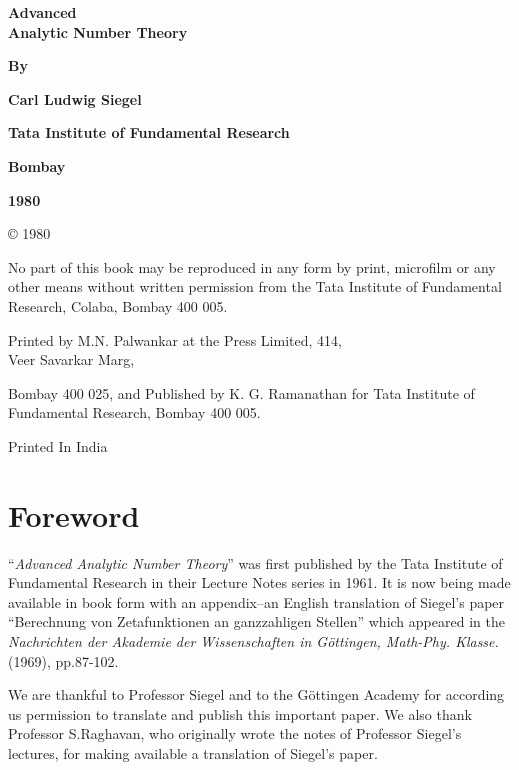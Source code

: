 \thispagestyle{empty}

\begin{center}
{\Large\bf Advanced}\\[5pt]
{\Large\bf Analytic Number Theory}
\vskip 1cm

{\bf By}
\medskip

{\large\bf Carl Ludwig Siegel}
\vfill

{\bf Tata Institute of Fundamental Research}

{\bf Bombay}

{\bf 1980}

\end{center}
\eject

\thispagestyle{empty}
\vfill

\begin{center}
\copyright {} 1980


\vfill

\parbox{0.7\textwidth}{No part of this book may be reproduced
in any form by print, microfilm or any
other means without written permission
from the Tata Institute of Fundamental
Research, Colaba, Bombay 400 005.}
\vfill

Printed by M.N. Palwankar at the Press Limited, 414,\\ Veer Savarkar
Marg,

Bombay 400 025, and Published by K. G. Ramanathan for Tata Institute
of Fundamental Research, Bombay 400 005.
\vfill 

Printed In India
\end{center}

\eject

\chapter{Foreword}


``{\em Advanced Analytic Number Theory}'' was first published by the
Tata Institute of Fundamental Research in their Lecture Notes series
in 1961. It is now being made available in book form with an
appendix--an English translation of Siegel's paper ``Berechnung von
Zetafunktionen an ganzzahligen Stellen'' which appeared in the {\em
  Nachrichten der Akademie der Wissenschaften in G\"ottingen,
  Math-Phy. Klasse.} (1969), pp.\@ 87-102.  

\medskip


We are thankful to Professor Siegel and to the G\"ottingen Academy for
according us permission to translate and publish this important
paper. We also thank Professor S.\@ Raghavan, who originally wrote the
notes of Professor Siegel's lectures, for making available a
translation of Siegel's paper.
\vskip 1cm

